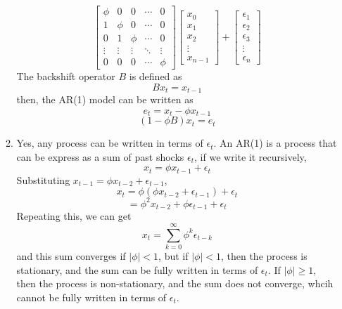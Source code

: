 \documentclass[12pt]{article}
\begin{document}
\begin{enumerate}
\begin{enumerate}
\[\begin{bmatrix}
        \phi & 0 & 0 & \cdots & 0 \\
        1 & \phi & 0 & \cdots & 0 \\
        0 & 1 & \phi & \cdots & 0 \\
        \vdots & \vdots & \vdots & \ddots & \vdots \\
        0 & 0 & 0 & \cdots & \phi
    \end{bmatrix}
    \begin{bmatrix}
        x_0 \\
        x_{1} \\
        x_{2} \\
        \vdots \\
        x_{n-1}
    \end{bmatrix}
    +
    \begin{bmatrix}
        \epsilon_1 \\
        \epsilon_2 \\
        \epsilon_3 \\
        \vdots \\
        \epsilon_n
    \end{bmatrix}
    \]
    The backshift operator $B$ is defined as
    \[ Bx_t = x_{t-1} \]
    then, the AR(1) model can be written as
    \[ e_t = x_t - \phi x_{t-1} \]
    \[ (1 - \phi B)x_t = e_t \]
    \item Yes, any process can be written in terms of $\epsilon_t$.
    An AR(1) is a process that can be express as a sum of
    past shocks $\epsilon_t$, if we write it recursively,
    \[ x_t = \phi x_{t-1} + \epsilon_t \]
    Substituting $x_{t-1} = \phi x_{t-2} + \epsilon_{t-1}$,
    \[ x_t = \phi(\phi x_{t-2} + \epsilon_{t-1}) + \epsilon_t \]
    \[ = \phi^2 x_{t-2} + \phi \epsilon_{t-1} + \epsilon_t \]
    Repeating this, we can get
    \[ x_t = \sum_{k=0}^{\infty} \phi^k \epsilon_{t-k} \]
    and this sum converges if $|\phi| < 1$, but if
    $|\phi| < 1$, then the process is stationary,
    and the sum can be fully written in terms of $\epsilon_t$.
    If $|\phi| \geq 1$, then the process is non-stationary,
    and the sum does not converge, whcih cannot be fully
    written in terms of $\epsilon_t$.
    \end{enumerate}
    
\end{enumerate}
\end{document}
